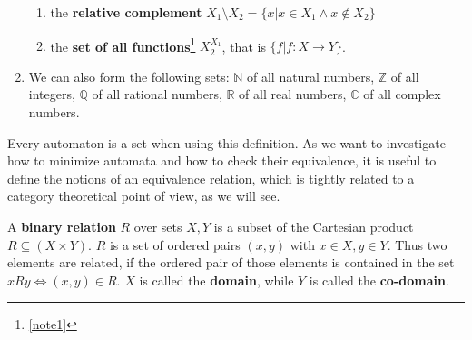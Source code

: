 \begin{definition}[Set]
\begin{enumerate}
\begin{enumerate}
                     \item the \textbf{relative complement} $X_1 \setminus X_2 = \{ x | x \in X_1 \wedge x \not\in X_2 \}$
                     
                     \item the \textbf{set of all functions}\footnote{\ref{note1}} $X_2^{X_1}$, that is $\{f | f: X \rightarrow Y\}$.
                    \end{enumerate}
                    
                    \item We can also form the following sets: $\mathbb{N}$ of all natural numbers, $\mathbb{Z}$ of all integers, $\mathbb{Q}$ of all rational numbers, $\mathbb{R}$ of all real numbers, $\mathbb{C}$ of all complex numbers.
             \end{enumerate}
            \end{definition}
            
            Every automaton is a set when using this definition. As we want to investigate how to minimize automata and how to check their equivalence, it is useful to define the notions of an equivalence relation, which is tightly related to a category theoretical point of view, as we will see.
            
            \begin{definition}\label{rel}
            A \textbf{binary relation} $R$ over sets $X,Y$ is a subset of the Cartesian product $R \subseteq (X \times Y)$. $R$ is a set of ordered pairs $(x, y)$ with $x \in X, y \in Y$. Thus two elements are related, if the ordered pair of those elements is contained in the set $xRy \Leftrightarrow (x,y) \in R$. $X$ is called the \textbf{domain}, while $Y$ is called the \textbf{co-domain}.
            \end{definition}
            
